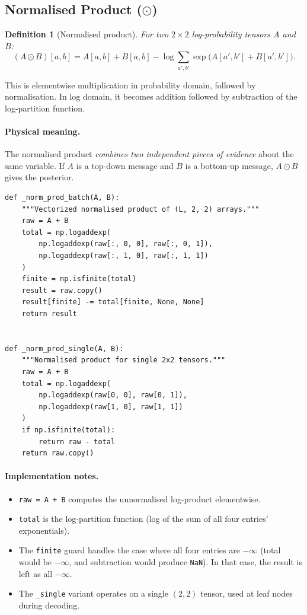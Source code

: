 \documentclass[11pt,a4paper]{article}
\newtheorem{definition}{Definition}[section]
\newcommand{\normprod}{\odot}
\begin{document}
\subsection{Normalised Product ($\normprod$)}
\label{subsec:norm_prod}

\begin{definition}[Normalised product]
For two $2 \times 2$ log-probability tensors $A$ and $B$:
\[
(A \normprod B)[a, b] = A[a, b] + B[a, b] - \log \sum_{a', b'} \exp\!\big(A[a', b'] + B[a', b']\big).
\]
\end{definition}

This is elementwise multiplication in probability domain, followed by normalisation. In log domain, it becomes addition followed by subtraction of the log-partition function.

\paragraph{Physical meaning.} The normalised product \emph{combines two independent pieces of evidence} about the same variable. If $A$ is a top-down message and $B$ is a bottom-up message, $A \normprod B$ gives the posterior.

\begin{lstlisting}[caption={Normalised product (\texttt{\_norm\_prod\_batch} and \texttt{\_norm\_prod\_single})}]
def _norm_prod_batch(A, B):
    """Vectorized normalised product of (L, 2, 2) arrays."""
    raw = A + B
    total = np.logaddexp(
        np.logaddexp(raw[:, 0, 0], raw[:, 0, 1]),
        np.logaddexp(raw[:, 1, 0], raw[:, 1, 1])
    )
    finite = np.isfinite(total)
    result = raw.copy()
    result[finite] -= total[finite, None, None]
    return result


def _norm_prod_single(A, B):
    """Normalised product for single 2x2 tensors."""
    raw = A + B
    total = np.logaddexp(
        np.logaddexp(raw[0, 0], raw[0, 1]),
        np.logaddexp(raw[1, 0], raw[1, 1])
    )
    if np.isfinite(total):
        return raw - total
    return raw.copy()
\end{lstlisting}

\paragraph{Implementation notes.}
\begin{itemize}
    \item \texttt{raw = A + B} computes the unnormalised log-product elementwise.
    \item \texttt{total} is the log-partition function (log of the sum of all four entries' exponentials).
    \item The \texttt{finite} guard handles the case where all four entries are $-\infty$ (total would be $-\infty$, and subtraction would produce \texttt{NaN}). In that case, the result is left as all $-\infty$.
    \item The \texttt{\_single} variant operates on a single $(2, 2)$ tensor, used at leaf nodes during decoding.
\end{itemize}
\end{document}
